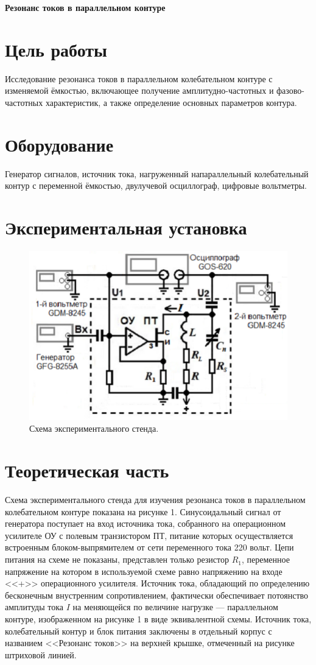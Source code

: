 \documentclass[a4paper, fontsize=14pt]{article}
\begin{document}


\huge
\centering
\textbf{Резонанс токов в параллельном контуре}

\raggedright
\parindent=1cm
\large
	\section*{Цель работы}
 Исследование резонанса токов в параллельном колебательном контуре с изменяемой ёмкостью, включающее получение амплитудно-частотных и фазово-частотных характеристик, а также определение основных параметров контура.
 	\section*{Оборудование}
 Генератор сигналов, источник тока, нагруженный напараллельный колебательный контур с переменной ёмкостью, двулучевой осциллограф, цифровые вольтметры.
	\section*{Экспериментальная установка}
	\begin{figure}[H]
	\includegraphics[width = 1.0\linewidth]{ust.png}
	\caption{Схема экспериментального стенда.}
	\end{figure}
	\section*{Теоретическая часть}
	Схема экспериментального стенда для изучения резонанса токов в параллельном колебательном контуре показана на рисунке 1. Синусоидальный сигнал от генератора  поступает на вход источника тока, собранного на операционном усилителе ОУ с полевым транзистором ПТ, питание которых осуществляется встроенным блоком-выпрямителем от сети переменного тока 220 вольт. Цепи питания на схеме не показаны, представлен только резистор $R_1$, переменное напряжение на котором в используемой схеме равно напряжению на входе <<+>> операционного усилителя. Источник тока, обладающий по определению бесконечным внустренним сопротивлением, фактически обеспечивает потоянство амплитуды тока $I$ на меняющейся по величине нагрузке --- параллельном контуре, изображенном на рисунке 1 в виде эквивалентной схемы. Источник тока, колебательный контур и блок питания заключены в отдельный корпус с названием <<Резонанс токов>> на верхней крышке, отмеченный на рисунке штриховой линией.
	
\end{document}
